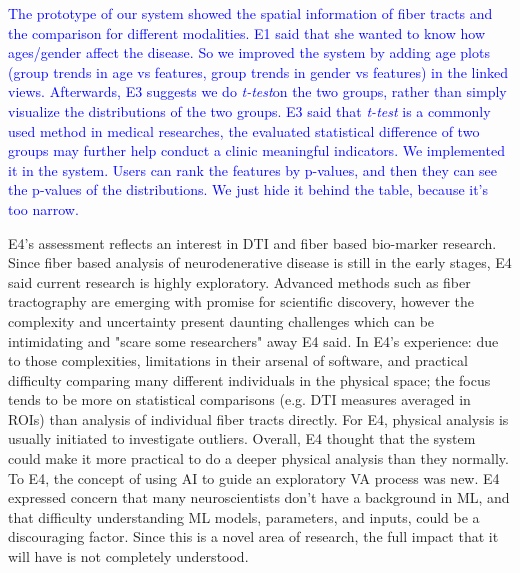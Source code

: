 \textcolor{blue}{The prototype of our system showed the spatial information of fiber tracts and the comparison for different modalities. E1 said that she wanted to know how ages/gender affect the disease. So we improved the system by adding age plots (group trends in age vs features, group trends in gender vs features) in the linked views. Afterwards, E3 suggests we do \textit{t-test}on the two groups, rather than simply visualize the distributions of the two groups. E3 said that \textit{t-test} is a commonly used method in medical researches, the evaluated statistical difference of two groups may further help conduct a clinic meaningful indicators. We implemented it in the system. Users can rank the features by p-values, and then they can see the p-values of the distributions. We just hide it behind the table, because it’s too narrow.}

E4's assessment reflects an interest in DTI and fiber based bio-marker research. Since fiber based analysis of neurodenerative disease is still in the early stages, E4 said current research is highly exploratory. Advanced methods such as fiber tractography are emerging with promise for scientific discovery, however the complexity and uncertainty present daunting challenges which can be intimidating and "scare some researchers" away E4 said. In E4's experience: due to those complexities, limitations in their arsenal of software, and practical difficulty comparing many different individuals in the physical space; the focus tends to be more on statistical comparisons (e.g. DTI measures averaged in ROIs) than analysis of individual fiber tracts directly. For E4, physical analysis is usually initiated to investigate outliers. Overall, E4 thought that the system could make it more practical to do a deeper physical analysis than they normally. To E4, the concept of using AI to guide an exploratory VA process was new. E4 expressed concern that many neuroscientists don't have a background in ML, and that difficulty understanding ML models, parameters, and inputs, could be a discouraging factor. Since this is a novel area of research, the full impact that it will have is not completely understood.

